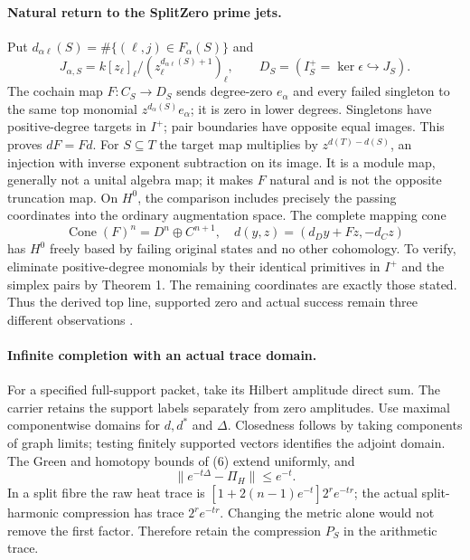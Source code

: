\documentclass[10pt,a4paper]{article}
\begin{document}
\newpage
\paragraph{Natural return to the SplitZero prime jets.}
Put $d_{\alpha\ell}(S)=\#\{(\ell,j)\in F_\alpha(S)\}$ and
\[
 J_{\alpha,S}=k[z_\ell]_\ell/(z_\ell^{d_{\alpha\ell}(S)+1})_\ell,
 \qquad D_S=(I_S^+=\ker\epsilon\hookrightarrow J_S).
\]
The cochain map $F:C_S\to D_S$ sends degree-zero $e_\alpha$ and every
failed singleton to the same top monomial $z^{d_\alpha(S)}e_\alpha$;
it is zero in lower degrees. Singletons have positive-degree targets in
$I^+$; pair boundaries have opposite equal images. This proves $dF=Fd$.
For $S\subseteq T$ the target map multiplies by
$z^{d(T)-d(S)}$, an injection with inverse exponent subtraction on its image.
It is a module map, generally not a unital algebra map; it makes $F$ natural
and is not the opposite truncation map.
On $H^0$, the comparison includes precisely the passing coordinates into
the ordinary augmentation space. The complete mapping cone
\[
 \operatorname{Cone}(F)^n=D^n\oplus C^{n+1},\quad
 d(y,z)=(d_Dy+Fz,-d_Cz)
\]
has $H^0$ freely based by failing original states and no other cohomology.
To verify, eliminate positive-degree monomials by their identical primitives
in $I^+$ and the simplex pairs by Theorem 1. The remaining coordinates are
exactly those stated. Thus the derived top line, supported zero and actual
success remain three different observations \cite{SZ}.

\paragraph{Infinite completion with an actual trace domain.}
For a specified full-support packet, take its Hilbert amplitude direct sum.
The carrier retains the support labels separately from zero amplitudes. Use maximal
componentwise domains for $d,d^*$ and $\Delta$. Closedness follows by taking
components of graph limits; testing finitely supported vectors identifies
the adjoint domain. The Green and homotopy bounds of (6) extend uniformly,
and
\[
 \|e^{-t\Delta}-\Pi_H\|\le e^{-t}.
\]
In a split fibre the raw heat trace is
$[1+2(n-1)e^{-t}]2^re^{-tr}$; the actual split-harmonic compression has
trace $2^re^{-tr}$. Changing the metric alone would not remove the first
factor. Therefore retain the compression $P_S$ in the arithmetic trace.
\end{document}
